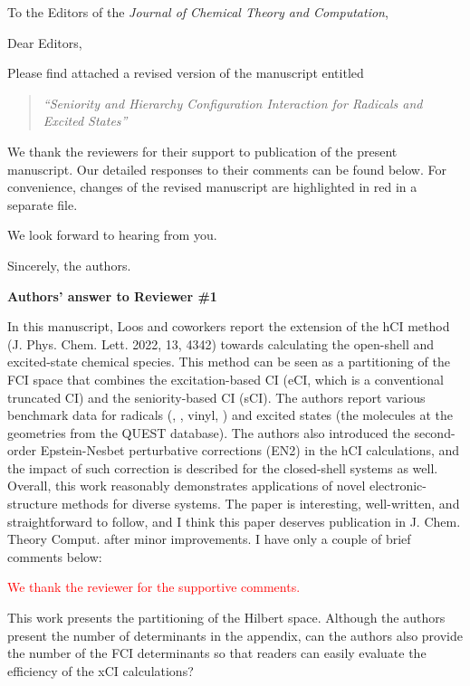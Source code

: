 \documentclass[10pt]{letter}
\newcommand{\alert}[1]{\textcolor{red}{#1}}
\begin{document}
\begin{letter}%
{To the Editors of the \textit{Journal of Chemical Theory and Computation},}

\opening{Dear Editors,}

\justifying
Please find attached a revised version of the manuscript entitled
\begin{quote}
	\textit{``Seniority and Hierarchy Configuration Interaction for Radicals and Excited States''}
\end{quote}

We thank the reviewers for their support to publication of the present manuscript.
Our detailed responses to their comments can be found below.
For convenience, changes of the revised manuscript are highlighted in red in a separate file.

We look forward to hearing from you.

\closing{Sincerely, the authors.}

\newpage

\noindent \textbf{\large Authors' answer to Reviewer \#1}

{In this manuscript, Loos and coworkers report the extension of the hCI method (J. Phys. Chem. Lett. 2022, 13, 4342) towards calculating the open-shell and excited-state chemical species.
This method can be seen as a partitioning of the FCI space that combines the excitation-based CI (eCI, which is a conventional truncated CI) and the seniority-based CI (sCI).
The authors report various benchmark data for radicals (, , vinyl, ) and excited states (the molecules at the geometries from the QUEST database).
The authors also introduced the second-order Epstein-Nesbet perturbative corrections (EN2) in the hCI calculations,
and the impact of such correction is described for the closed-shell systems as well.
Overall, this work reasonably demonstrates applications of novel electronic-structure methods for diverse systems.
The paper is interesting, well-written, and straightforward to follow, and I think this paper deserves publication in J. Chem. Theory Comput. after minor improvements.
I have only a couple of brief comments below:
}

\alert{
We thank the reviewer for the supportive comments.
}


{This work presents the partitioning of the Hilbert space. Although the authors present the number
of determinants in the appendix, can the authors also provide the number of the FCI determinants
so that readers can easily evaluate the efficiency of the xCI calculations?
}


\end{letter}
\end{document}
